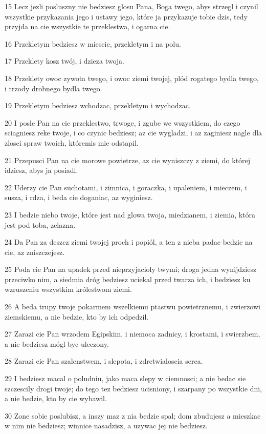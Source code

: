 \par 15 Lecz jezli posluszny nie bedziesz glosu Pana, Boga twego, abys strzegl i czynil wszystkie przykazania jego i ustawy jego, które ja przykazuje tobie dzis, tedy przyjda na cie wszystkie te przeklestwa, i ogarna cie.
\par 16 Przekletym bedziesz w miescie, przekletym i na polu.
\par 17 Przeklety kosz twój, i dzieza twoja.
\par 18 Przeklety owoc zywota twego, i owoc ziemi twojej, plód rogatego bydla twego, i trzody drobnego bydla twego.
\par 19 Przekletym bedziesz wchodzac, przekletym i wychodzac.
\par 20 I posle Pan na cie przeklestwo, trwoge, i zgube we wszystkiem, do czego sciagniesz reke twoje, i co czynic bedziesz; az cie wygladzi, i az zaginiesz nagle dla zlosci spraw twoich, któremis mie odstapil.
\par 21 Przepusci Pan na cie morowe powietrze, az cie wyniszczy z ziemi, do której idziesz, abys ja posiadl.
\par 22 Uderzy cie Pan suchotami, i zimnica, i goraczka, i upaleniem, i mieczem, i susza, i rdza, i beda cie doganiac, az wyginiesz.
\par 23 I bedzie niebo twoje, które jest nad glowa twoja, miedzianem, i ziemia, która jest pod toba, zelazna.
\par 24 Da Pan za deszcz ziemi twojej proch i popiól, a ten z nieba padac bedzie na cie, az zniszczejesz.
\par 25 Poda cie Pan na upadek przed nieprzyjacioly twymi; droga jedna wynijdziesz przeciwko nim, a siedmia dróg bedziesz uciekal przed twarza ich, i bedziesz ku wzruszeniu wszystkim królestwom ziemi.
\par 26 A beda trupy twoje pokarmem wszelkiemu ptastwu powietrznemu, i zwierzowi ziemskiemu, a nie bedzie, kto by ich odpedzil.
\par 27 Zarazi cie Pan wrzodem Egipskim, i niemoca zadnicy, i krostami, i swierzbem, a nie bedziesz mógl byc uleczony.
\par 28 Zarazi cie Pan szalenstwem, i slepota, i zdretwialoscia serca.
\par 29 I bedziesz macal o poludniu, jako maca slepy w ciemnosci; a nie bedac sie szczescily drogi twoje; do tego tez bedziesz ucisniony, i szarpany po wszystkie dni, a nie bedzie, kto by cie wybawil.
\par 30 Zone sobie poslubisz, a inszy maz z nia bedzie spal; dom zbudujesz a mieszkac w nim nie bedziesz; winnice nasadzisz, a uzywac jej nie bedziesz.
